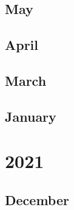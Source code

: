 \documentclass[12pt]{article}
\begin{document}
\subsection{May}
\begin{refsection}
    \nocite{zhang2022optopenpretrainedtransformer}
    \nocite{tay_unifying_2022}
    \printbibliography[heading=none]
\end{refsection}

\subsection{April}
\begin{refsection}
    \nocite{chowdhery2022palmscalinglanguagemodeling}
    \nocite{wu_inference_2025}
    \printbibliography[heading=none]
\end{refsection}

\subsection{March}
\begin{refsection}
    \nocite{ouyang_training_2022}
    \printbibliography[heading=none]
\end{refsection}


\subsection{January}
\begin{refsection}
    \nocite{wei_chain--thought_2023}
    \nocite{thoppilan_lamda_2022}
    \nocite{lewkowycz_solving_2022}
    \nocite{smith_using_2022}
    \printbibliography[heading=none]
\end{refsection}

\newpage
\section{2021}
\subsection{December}
\begin{refsection}
    \nocite{du_glam_2022}
    \nocite{nakano_webgpt_2021}
    \nocite{borgeaud_improving_2022}
    \nocite{rae_scaling_2022}
    \printbibliography[heading=none]
\end{refsection}
\end{document}
